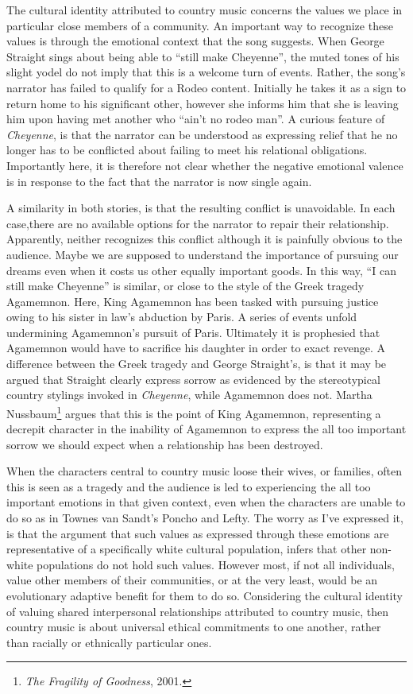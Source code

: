 \documentclass[phdthesis,12pt,final]{wuthesis}
\theoremstyle{definition}
\theoremstyle{definition}
\theoremstyle{definition}
\theoremstyle{definition}
\theoremstyle{remark}
\begin{document}
The cultural identity attributed to country music concerns the values we place in particular close members of a community. An important way to recognize these values is through the emotional context that the song suggests. When George Straight sings about being able to ``still make Cheyenne'', the muted tones of his slight yodel do not imply that this is a welcome turn of events. Rather, the song's narrator has failed to qualify for a Rodeo content. Initially he takes it as a sign to return home to his significant other, however she informs him that she is leaving him upon having met another who ``ain't no rodeo man''. A curious feature of \emph{Cheyenne}, is that the narrator can be understood as expressing relief that he no longer has to be conflicted about failing to meet his relational obligations. Importantly here, it is therefore not clear whether the negative emotional valence is in response to the fact that the narrator is now single again.

A similarity in both stories, is that the resulting conflict is unavoidable. In each case,there are no available options for the narrator to repair their relationship. Apparently, neither recognizes this conflict although it is painfully obvious to the audience. Maybe we are supposed to understand the importance of pursuing our dreams even when it costs us other equally important goods. In this way, ``I can still make Cheyenne'' is similar, or close to the style of the Greek tragedy Agamemnon. Here, King Agamemnon has been tasked with pursuing justice owing to his sister in law's abduction by Paris. A series of events unfold undermining Agamemnon's pursuit of Paris. Ultimately it is prophesied that Agamemnon would have to sacrifice his daughter in order to exact revenge. A difference between the Greek tragedy and George Straight's, is that it may be argued that Straight clearly express sorrow as evidenced by the stereotypical country stylings invoked in \emph{Cheyenne}, while Agamemnon does not. Martha Nussbaum\footnote{\emph{The {Fragility} of {Goodness}}, 2001.} argues that this is the point of King Agamemnon, representing a decrepit character in the inability of Agamemnon to express the all too important sorrow we should expect when a relationship has been destroyed.

When the characters central to country music loose their wives, or families, often this is seen as a tragedy and the audience is led to experiencing the all too important emotions in that given context, even when the characters are unable to do so as in Townes van Sandt's Poncho and Lefty. The worry as I've expressed it, is that the argument that such values as expressed through these emotions are representative of a specifically white cultural population, infers that other non-white populations do not hold such values. However most, if not all individuals, value other members of their communities, or at the very least, would be an evolutionary adaptive benefit for them to do so. Considering the cultural identity of valuing shared interpersonal relationships attributed to country music, then country music is about universal ethical commitments to one another, rather than racially or ethnically particular ones.
\end{document}

